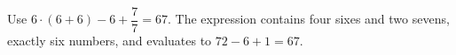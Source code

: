 Use $\boxed{6\cdot(6+6)-6+\dfrac{7}{7}=67}$. The expression contains four sixes and two sevens, exactly six numbers, and evaluates to $72-6+1=67$.
